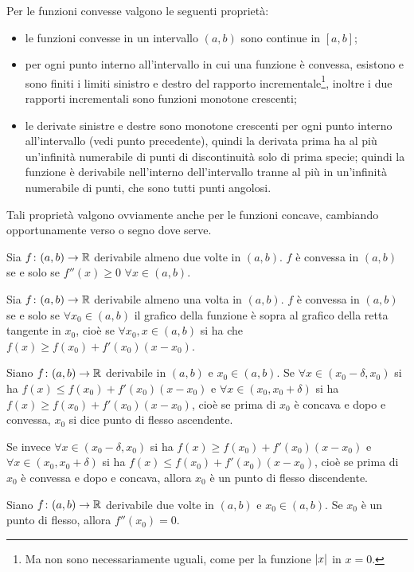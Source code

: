 Per le funzioni convesse valgono le seguenti proprietà:
\begin{itemize}
\item le funzioni convesse in un intervallo $(a,b)$ sono continue in $[a,b]$;
\item per ogni punto interno all'intervallo in cui una funzione è convessa, esistono e sono finiti i limiti sinistro e destro del rapporto incrementale\footnote{Ma non sono necessariamente uguali, come per la funzione $\lvert x\rvert$ in $x=0$.}, inoltre i due rapporti incrementali sono funzioni monotone crescenti;
\item le derivate sinistre e destre sono monotone crescenti per ogni punto interno all'intervallo (vedi punto precedente), quindi la derivata prima ha al più un'infinità numerabile di punti di discontinuità solo di prima specie; quindi la funzione è derivabile nell'interno dell'intervallo tranne al più in un'infinità numerabile di punti, che sono tutti punti angolosi.
\end{itemize}
Tali proprietà valgono ovviamente anche per le funzioni concave, cambiando opportunamente verso o segno dove serve.
\begin{teorema}
Sia $f\colon(a,b)\to\mathbb{R}$ derivabile almeno due volte in $(a,b)$. $f$ è convessa in $(a,b)$ se e solo se $f''(x)\geq 0$ $\forall x\in(a,b)$.
\end{teorema}
\begin{teorema}
Sia $f\colon(a,b)\to\mathbb{R}$ derivabile almeno una volta in $(a,b)$. $f$ è convessa in $(a,b)$ se e solo se $\forall x_0\in(a,b)$ il grafico della funzione è sopra al grafico della retta tangente in $x_0$, cioè se $\forall x_0,x\in(a,b)$ si ha che $f(x)\geq f(x_0)+f'(x_0)(x-x_0)$.
\end{teorema}
\begin{definizione}
Siano $f\colon(a,b)\to\mathbb{R}$ derivabile in $(a,b)$ e $x_0\in(a,b)$. Se $\forall x\in(x_0-\delta,x_0)$ si ha $f(x)\leq f(x_0)+f'(x_0)(x-x_0)$ e $\forall x\in(x_0,x_0+\delta)$ si ha $f(x)\geq f(x_0)+f'(x_0)(x-x_0)$, cioè se prima di $x_0$ è concava e dopo e convessa, $x_0$ si dice punto di flesso ascendente.

Se invece $\forall x\in(x_0-\delta,x_0)$ si ha $f(x)\geq f(x_0)+f'(x_0)(x-x_0)$ e $\forall x\in(x_0,x_0+\delta)$ si ha $f(x)\leq f(x_0)+f'(x_0)(x-x_0)$, cioè se prima di $x_0$ è convessa e dopo e concava, allora $x_0$ è un punto di flesso discendente.
\end{definizione}
\begin{teorema}
Siano $f\colon(a,b)\to\mathbb{R}$ derivabile due volte in $(a,b)$ e $x_0\in(a,b)$. Se $x_0$ è un punto di flesso, allora $f''(x_0)=0$.
\end{teorema}
